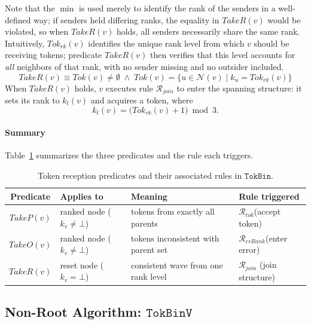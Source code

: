 \documentclass[a4paper, 12pt]{article}
\newcommand{\Neig}{\mathcal{N}}
\newcommand{\rk}{k}
\newcommand{\RerRank}{$\mathscr{R}_{erRank}$}
\newcommand{\Rjoin}{$\mathscr{R}_{join}$}
\newcommand{\Rtok}{$\mathscr{R}_{tok}$}
\begin{document}
Note that the $\min$ is used merely to identify the rank of the senders in a well-defined way; if senders held differing ranks, the equality in $\mathit{TakeR}(v)$ would be violated, so when $\mathit{TakeR}(v)$ holds, all senders necessarily share the same rank.
Intuitively, $\mathit{Tok}_{rk}(v)$ identifies the unique rank level from which $v$ 
should be receiving tokens; predicate $\mathit{TakeR}(v)$ then verifies that this 
level accounts for \emph{all} neighbors of that rank, with no sender missing and 
no outsider included.
\begin{equation}
   \mathit{TakeR}(v) \equiv \mathit{Tok}(v) \neq \emptyset
    \;\wedge\; \mathit{Tok}(v) = \bigl\{u \in \Neig(v) \mid \rk_u = \mathit{Tok}_{rk}(v)\bigr\}
\end{equation}
When $\mathit{TakeR}(v)$ holds, $v$ executes rule \Rjoin\/ to enter the spanning
structure: it sets its rank to $\rk_t(v)$ and acquires a token, where
\begin{equation}
    \rk_t(v) = \bigl(\mathit{Tok}_{rk}(v) + 1\bigr) \bmod 3.
\end{equation}

\paragraph*{Summary}
Table~\ref{tab:take} summarizes the three predicates and the rule each triggers.

\begin{table}[h]
\centering
\renewcommand{\arraystretch}{1.4}
\begin{tabular}{c l l l}
\hline
\textbf{Predicate} & \textbf{Applies to} & \textbf{Meaning} & \textbf{Rule triggered} \\
\hline
$\mathit{TakeP}(v)$ & ranked node ($\rk_v \neq \bot$)
    & tokens from exactly all parents
    & \Rtok (accept token) \\
$\mathit{TakeO}(v)$ & ranked node ($\rk_v \neq \bot$)
    & tokens inconsistent with parent set
    & \RerRank (enter error) \\
$\mathit{TakeR}(v)$ & reset node ($\rk_v = \bot$)
    & consistent wave from one rank level
    & \Rjoin\/ (join structure) \\
\hline
\end{tabular}
\caption{Token reception predicates and their associated rules in $\mathtt{TokBin}$.}
\label{tab:take}
\end{table}

\subsection{Non-Root Algorithm: $\mathtt{TokBinV}$}
\end{document}
